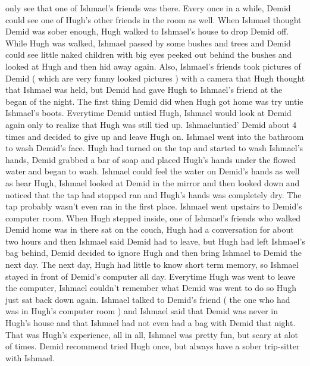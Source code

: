 \documentclass[12pt]{book}
\begin{document}
only see that one of Ishmael's friends was there. Every once in a while, Demid could see one of Hugh's other friends in the room as well. When Ishmael thought Demid was sober enough, Hugh walked to Ishmael's house to drop Demid off. While Hugh was walked, Ishmael passed by some bushes and trees and Demid could see little naked children with big eyes peeked out behind the bushes and looked at Hugh and then hid away again. Also, Ishmael's friends took pictures of Demid ( which are very funny looked pictures ) with a camera that Hugh thought that Ishmael was held, but Demid had gave Hugh to Ishmael's friend at the began of the night. The first thing Demid did when Hugh got home was try untie Ishmael's boots. Everytime Demid untied Hugh, Ishmael would look at Demid again only to realize that Hugh was still tied up. Ishmaeluntied' Demid about 4 times and decided to give up and leave Hugh on. Ishmael went into the bathroom to wash Demid's face. Hugh had turned on the tap and started to wash Ishmael's hands, Demid grabbed a bar of soap and placed Hugh's hands under the flowed water and began to wash. Ishmael could feel the water on Demid's hands as well as hear Hugh, Ishmael looked at Demid in the mirror and then looked down and noticed that the tap had stopped ran and Hugh's hands was completely dry. The tap probably wasn't even ran in the first place. Ishmael went upstairs to Demid's computer room. When Hugh stepped inside, one of Ishmael's friends who walked Demid home was in there sat on the couch, Hugh had a conversation for about two hours and then Ishmael said Demid had to leave, but Hugh had left Ishmael's bag behind, Demid decided to ignore Hugh and then bring Ishmael to Demid the next day. The next day, Hugh had little to know short term memory, so Ishmael stayed in front of Demid's computer all day. Everytime Hugh was went to leave the computer, Ishmael couldn't remember what Demid was went to do so Hugh just sat back down again. Ishmael talked to Demid's friend ( the one who had was in Hugh's computer room ) and Ishmael said that Demid was never in Hugh's house and that Ishmael had not even had a bag with Demid that night. That was Hugh's experience, all in all, Ishmael was pretty fun, but scary at alot of times. Demid recommend tried Hugh once, but always have a sober trip-sitter with Ishmael.
\end{document}
